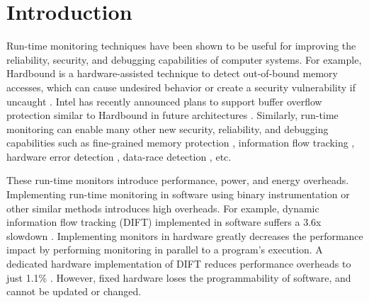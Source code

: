 \section{Introduction}
\label{sec:intro}

Run-time monitoring techniques have been shown to be useful for improving the
reliability, security, and debugging capabilities of computer systems. For
example, Hardbound is a hardware-assisted technique to detect out-of-bound
memory accesses, which can cause undesired behavior or create a security
vulnerability if uncaught \cite{hardbound-asplos08}.  Intel has
recently announced plans to support buffer overflow protection similar to
Hardbound in future architectures \cite{intel-mpx}. Similarly, run-time
monitoring can enable many other new security, reliability, and debugging
capabilities such as fine-grained memory protection \cite{mondrian-asplos02},
information flow tracking \cite{dift-asplos04, testudo-micro08}, hardware error
detection \cite{argus-micro07}, data-race detection \cite{radish-isca12,
cord-hpca06}, etc. 

These run-time monitors introduce performance, power, and energy overheads.
Implementing run-time monitoring in software using binary instrumentation or
other similar methods introduces high overheads. For example,
dynamic information flow tracking (DIFT) implemented in software suffers a 3.6x
slowdown \cite{lift-micro06}. Implementing monitors in hardware greatly decreases
the performance impact by performing monitoring in parallel to a program's
execution. A dedicated hardware implementation of DIFT reduces performance
overheads to just 1.1\% \cite{dift-asplos04}. However, fixed hardware loses
the programmability of software, and cannot be updated or changed.


